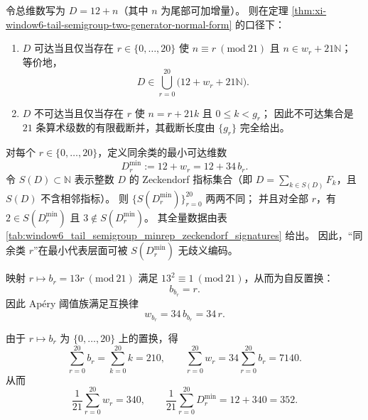 

\begin{proposition}[维数可达集合的有限截断同余并完全刻画]\label{prop:xi-window6-dimension-reachability-congruence-union}
令总维数写为 \(D=12+n\)（其中 \(n\) 为尾部可加增量）。
则在定理 \ref{thm:xi-window6-tail-semigroup-two-generator-normal-form} 的口径下：
\begin{enumerate}
  \item \(D\) 可达当且仅当存在 \(r\in\{0,\dots,20\}\) 使 \(n\equiv r\ (\mathrm{mod}\ 21)\) 且 \(n\in w_r+21\mathbb N\)；
  等价地，
  \[
  D\in\bigcup_{r=0}^{20}\bigl(12+w_r+21\mathbb N\bigr).
  \]
  \item \(D\) 不可达当且仅当存在 \(r\) 使 \(n=r+21k\) 且 \(0\le k<g_r\)；
  因此不可达集合是 \(21\) 条算术级数的有限截断并，其截断长度由 \(\{g_r\}\) 完全给出。
\end{enumerate}
\end{proposition}

\begin{proposition}\label{prop:xi-window6-minrep-zeckendorf-signature-injection}
对每个 \(r\in\{0,\dots,20\}\)，定义同余类的最小可达维数
\[
D_r^{\min}:=12+w_r=12+34\,b_r.
\]
令 \(S(D)\subset\mathbb N\) 表示整数 \(D\) 的 Zeckendorf 指标集合（即 \(D=\sum_{k\in S(D)}F_k\)，且 \(S(D)\) 不含相邻指标）。
则 \(\{S(D_r^{\min})\}_{r=0}^{20}\) 两两不同；
并且对全部 \(r\)，有 \(2\in S(D_r^{\min})\) 且 \(3\notin S(D_r^{\min})\)。
其全量数据由表 \ref{tab:window6_tail_semigroup_minrep_zeckendorf_signatures} 给出。
因此，“同余类 \(r\)”在最小代表层面可被 \(S(D_r^{\min})\) 无歧义编码。
\end{proposition}



\begin{proposition}\label{prop:xi-window6-congruence-involution}
映射 \(r\mapsto b_r=13r\ (\mathrm{mod}\ 21)\) 满足 \(13^2\equiv 1\ (\mathrm{mod}\ 21)\)，从而为自反置换：
\[
b_{b_r}=r.
\]
因此 Ap\'ery 阈值族满足互换律
\[
w_{b_r}=34\,b_{b_r}=34\,r.
\]
\end{proposition}

\begin{proposition}\label{prop:xi-window6-apery-first-moment}
由于 \(r\mapsto b_r\) 为 \(\{0,\dots,20\}\) 上的置换，得
\[
\sum_{r=0}^{20}b_r=\sum_{k=0}^{20}k=210,
\qquad
\sum_{r=0}^{20}w_r=34\sum_{r=0}^{20}b_r=7140.
\]
从而
\[
\frac{1}{21}\sum_{r=0}^{20}w_r=340,
\qquad
\frac{1}{21}\sum_{r=0}^{20}D_r^{\min}=12+340=352.
\]
\end{proposition}

